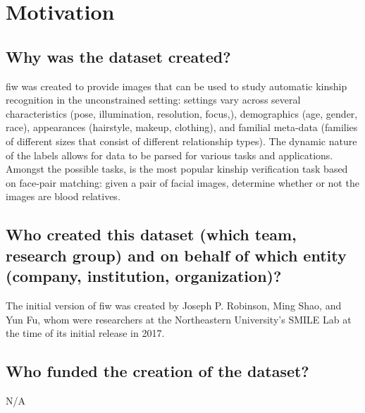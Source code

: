 
\section*{Motivation}
\subsection*{Why was the dataset created?} 
\noindent \gls{fiw} was created to provide images that can be used to study automatic kinship recognition in the unconstrained setting: settings vary across several characteristics (\eg pose, illumination, resolution, focus,), demographics (\eg age, gender, race), appearances (\eg hairstyle, makeup, clothing), and familial meta-data (\ie families of different sizes that consist of different relationship types). The dynamic nature of the labels allows for data to be parsed for various tasks and applications. Amongst the possible tasks, is the most popular kinship verification task based on face-pair matching: given a pair of facial images, determine whether or not the images are blood relatives.
\subsection*{Who created this dataset (\eg which team, research group) and on behalf of which entity (\eg company, institution, organization)?}
The initial version of \gls{fiw} was created by Joseph P. Robinson, Ming Shao, and Yun Fu, whom were researchers at the Northeastern University's SMILE Lab at the time of its initial release in 2017.
\subsection*{Who funded the creation of the dataset?}
N/A
